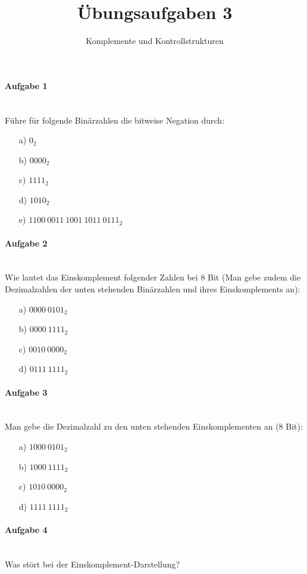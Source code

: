 \documentclass[12pt,a4paper,ngerman]{scrartcl}
\title{Übungsaufgaben 3}
\subtitle{Komplemente und Kontrollstrukturen}
\date{}
\begin{document}
	\maketitle
	
	\paragraph{Aufgabe 1}\mbox{}\\
	Führe für folgende Binärzahlen die bitweise Negation durch:
	\begin{itemize}
		\item[a)] $0_2$
		\item[b)] $0000_2$
		\item[c)] $1111_2$
		\item[d)] $1010_2$
		\item[e)] $1100\ 0011\ 1001\ 1011\ 0111_2$
	\end{itemize}
	
	\paragraph{Aufgabe 2}\mbox{}\\
	Wie lautet das Einskomplement folgender Zahlen bei 8 Bit (Man gebe zudem die Dezimalzahlen der unten stehenden Binärzahlen und ihres Einskomplements an):
	\begin{itemize}
		\item[a)] $0000\ 0101_2$
		\item[b)] $0000\ 1111_2$
		\item[c)] $0010\ 0000_2$
		\item[d)] $0111\ 1111_2$
	\end{itemize}
	
	\paragraph{Aufgabe 3}\mbox{}\\	
	Man gebe die Dezimalzahl zu den unten stehenden Einskomplementen an (8 Bit):
	\begin{itemize}
		\item[a)] $1000\ 0101_2$
		\item[b)] $1000\ 1111_2$
		\item[c)] $1010\ 0000_2$
		\item[d)] $1111\ 1111_2$
	\end{itemize}
	
	\paragraph{Aufgabe 4}\mbox{}\\	
	Was stört bei der Einskomplement-Darstellung?
	
\end{document}
